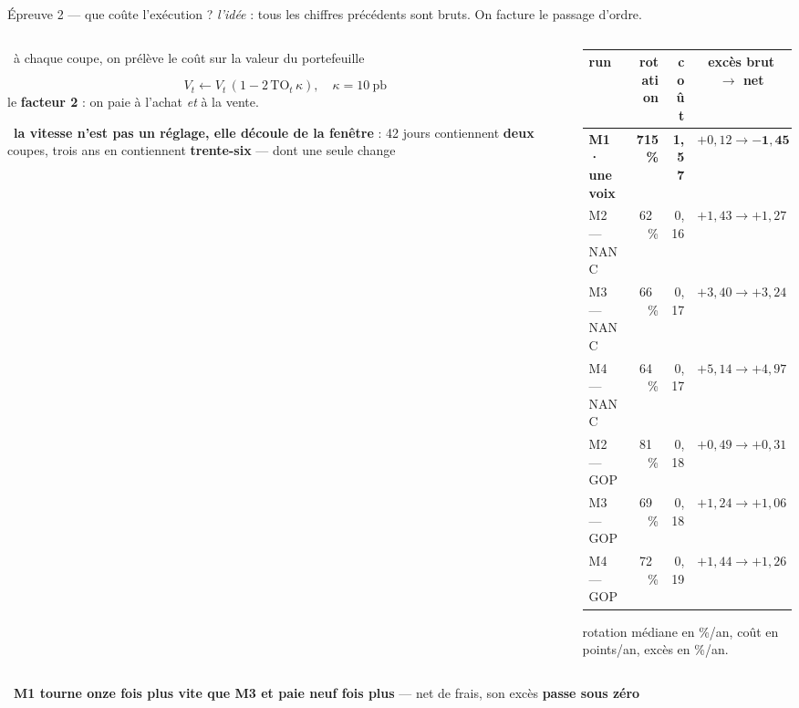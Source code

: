 \documentclass[11pt,aspectratio=169]{beamer}
\newcommand{\obs}[1]{{\color{bleu}\scriptsize\textbullet}~{\scriptsize #1}\par\vspace{0.4mm}}
\newcommand{\lire}[1]{{\scriptsize\color{grisf}#1}}
\begin{document}
\begin{frame}{Épreuve 2 --- que coûte l'exécution ?}
  \lire{\emph{l'idée} : tous les chiffres précédents sont bruts. On facture le passage d'ordre.}
  \par\vspace{2.5mm}
  \begin{columns}[T]
    \begin{column}{0.42\textwidth}
      \obs{à chaque coupe, on prélève le coût sur la valeur du portefeuille}
      \vspace{-1mm}
      {\footnotesize\[ V_t \leftarrow V_t\,(1 - 2\,\mathrm{TO}_t\,\kappa), \quad
                       \kappa = 10~\text{pb} \]}
      \vspace{-1mm}
      \lire{le \textbf{facteur 2} : on paie à l'achat \emph{et} à la vente.}
      \par\vspace{3mm}
      \obs{\textbf{la vitesse n'est pas un réglage, elle découle de la fenêtre} : 42 jours
       contiennent \textbf{deux} coupes, trois ans en contiennent \textbf{trente-six} --- dont
       une seule change}
    \end{column}
    \begin{column}{0.54\textwidth}
      \centering
      {\scriptsize\setlength{\tabcolsep}{7pt}
      \begin{tabular}{@{}l r r c@{}}
        \toprule
        run & rotation & coût & excès brut $\rightarrow$ net\\
        \midrule
        \textbf{M1 · une voix} & \textbf{715~\%} & \textbf{1,57} & $+0{,}12 \rightarrow \mathbf{-1{,}45}$\\
        \midrule
        M2 --- NANC & 62~\% & 0,16 & $+1{,}43 \rightarrow +1{,}27$\\
        M3 --- NANC & 66~\% & 0,17 & $+3{,}40 \rightarrow +3{,}24$\\
        M4 --- NANC & 64~\% & 0,17 & $+5{,}14 \rightarrow +4{,}97$\\
        \midrule
        M2 --- GOP & 81~\% & 0,18 & $+0{,}49 \rightarrow +0{,}31$\\
        M3 --- GOP & 69~\% & 0,18 & $+1{,}24 \rightarrow +1{,}06$\\
        M4 --- GOP & 72~\% & 0,19 & $+1{,}44 \rightarrow +1{,}26$\\
        \bottomrule
      \end{tabular}}\par\vspace{1.5mm}
      \raggedright
      \lire{rotation médiane en \%/an, coût en points/an, excès en \%/an.}
    \end{column}
  \end{columns}
  \par\vspace{2mm}
  \obs{\textbf{M1 tourne onze fois plus vite que M3 et paie neuf fois plus} --- net de frais,
   son excès \textbf{passe sous zéro}}
\end{frame}
\end{document}
